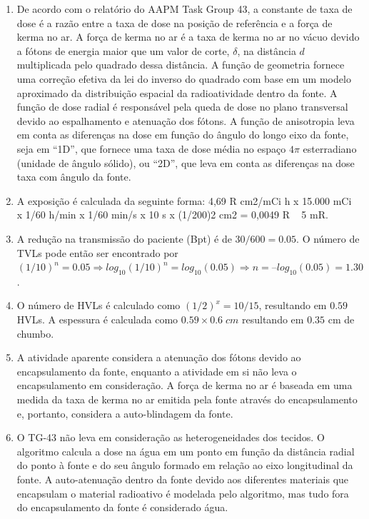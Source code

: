 \documentclass[11pt,a4paper]{article}
\begin{document}
\begin{enumerate}
        \item De acordo com o relatório do AAPM Task Group 43, a constante de taxa de dose é a razão entre a taxa de dose na posição de referência e a força de kerma no ar. A força de kerma no ar é a taxa de kerma no ar no vácuo devido a fótons de energia maior que um valor de corte, $\delta$, na distância $d$ multiplicada pelo quadrado dessa distância. A função de geometria fornece uma correção efetiva da lei do inverso do quadrado com base em um modelo aproximado da distribuição espacial da radioatividade dentro da fonte. A função de dose radial é responsável pela queda de dose no plano transversal devido ao espalhamento e atenuação dos fótons. A função de anisotropia leva em conta as diferenças na dose em função do ângulo do longo eixo da fonte, seja em “1D”, que fornece uma taxa de dose média no espaço $4\pi$ esterradiano (unidade de ângulo sólido), ou “2D”, que leva em conta as diferenças na dose taxa com ângulo da fonte.
    
        \item A exposição é calculada da seguinte forma: 4,69 R cm2/mCi h x 15.000 mCi x 1/60 h/min x 1/60 min/s x 10 s x (1/200)2 cm2 = 0,0049 R ~ 5 mR.
   
        \item A redução na transmissão do paciente (Bpt) é de $30/600 = 0.05$. O número de TVLs pode então ser encontrado por $(1/10)^n = 0.05 \Rightarrow log_{10} (1/10)^n = log_{10}(0.05) \Rightarrow n = –log_{10} (0.05) = 1.30$.
    
        \item O número de HVLs é calculado como $(1/2)^x = 10/15$, resultando em $0.59$ HVLs. A espessura é calculada como $0.59 \times 0.6 \;cm$ resultando em  $0.35$ cm de chumbo.
    
        \item A atividade aparente considera a atenuação dos fótons devido ao encapsulamento da fonte, enquanto a atividade em si não leva o encapsulamento em consideração. A força de kerma no ar é baseada em uma medida da taxa de kerma no ar emitida pela fonte através do encapsulamento e, portanto, considera a auto-blindagem da fonte.
    
        \item O TG-43 não leva em consideração as heterogeneidades dos tecidos. O algoritmo calcula a dose na água em um ponto em função da distância radial do ponto à fonte e do seu ângulo formado em relação ao eixo longitudinal da fonte. A auto-atenuação dentro da fonte devido aos diferentes materiais que encapsulam o material radioativo é modelada pelo algoritmo, mas tudo fora do encapsulamento da fonte é considerado água.
    

\end{enumerate}
\end{document}
